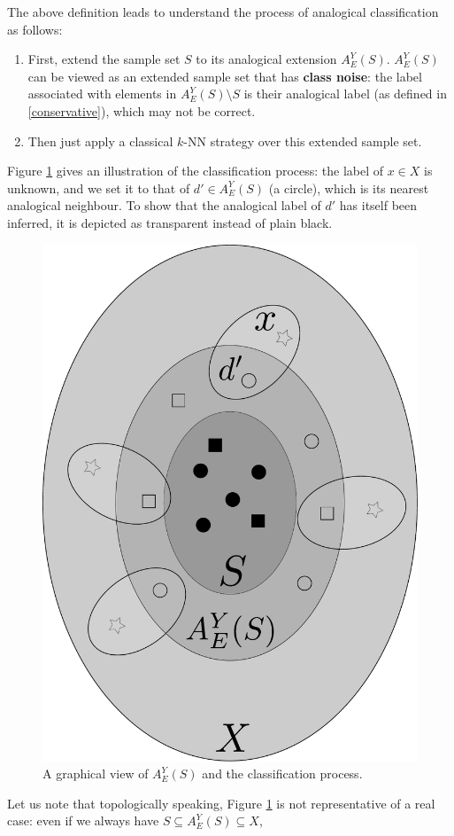 The above definition leads to understand the process of analogical classification as follows:
\begin{enumerate}
  \item First, extend the sample set $S$ to its analogical extension
    $A_E^Y(S)$. $A_E^Y(S)$ can be viewed as an extended sample set that has
    \textbf{class noise}: the label associated with elements in $A_E^Y(S)
    \setminus S$ is their analogical label (as defined in \ref{conservative}),
    which may not be correct.
  \item Then just apply a classical $k$-NN strategy over this extended sample
    set.
\end{enumerate}

Figure \ref{extension} gives an illustration of the classification process: the
label of $x \in X$ is unknown, and we set it to that of $d' \in A_E^Y(S)$ (a
circle), which is its nearest analogical neighbour. To show that the analogical
label of $d'$ has itself been inferred, it is depicted as transparent instead of
plain black.
\begin{figure}
\caption{A graphical view of $A_E^Y(S)$ and the classification process.}
\label{extension}
\begin{center}
\includegraphics[scale=0.20]{figures/analogical_extension.pdf}
\end{center}
\end{figure}
Let us note that topologically speaking, Figure \ref{extension} is not
representative of a real case: even if we always have $S \subseteq A_E^Y(S) \subseteq X$,


